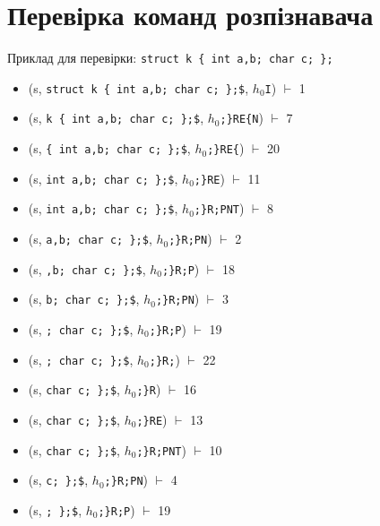 \newcommand{\xvdash}[1]{$\stackrel{\text{#1}}{\vdash}$}

\newpage
\section{Перевірка команд розпізнавача}
Приклад для перевірки: \verb|struct k { int a,b; char c; };|
\begin{itemize}
    \item[]  (s, \quad \verb|struct k { int a,b; char c; };$|,    \quad $h_{0}$\verb|I|)            $\vdash$ 1
    \item[]  (s, \quad \verb|k { int a,b; char c; };$|,           \quad $h_{0}$\verb|;}RE{N|)       $\vdash$ 7
    \item[]  (s, \quad \verb|{ int a,b; char c; };$|,             \quad $h_{0}$\verb|;}RE{|)        $\vdash$ 20
    \item[]  (s, \quad \verb|int a,b; char c; };$|,               \quad $h_{0}$\verb|;}RE|)         $\vdash$ 11
    \item[]  (s, \quad \verb|int a,b; char c; };$|,               \quad $h_{0}$\verb|;}R;PNT|)      $\vdash$ 8
    \item[]  (s, \quad \verb|a,b; char c; };$|,                   \quad $h_{0}$\verb|;}R;PN|)       $\vdash$ 2
    \item[]  (s, \quad \verb|,b; char c; };$|,                    \quad $h_{0}$\verb|;}R;P|)        $\vdash$ 18
    \item[]  (s, \quad \verb|b; char c; };$|,                     \quad $h_{0}$\verb|;}R;PN|)       $\vdash$ 3
    \item[]  (s, \quad \verb|; char c; };$|,                      \quad $h_{0}$\verb|;}R;P|)        $\vdash$ 19
    \item[]  (s, \quad \verb|; char c; };$|,                      \quad $h_{0}$\verb|;}R;|)         $\vdash$ 22
    \item[]  (s, \quad \verb|char c; };$|,                        \quad $h_{0}$\verb|;}R|)          $\vdash$ 16
    \item[]  (s, \quad \verb|char c; };$|,                        \quad $h_{0}$\verb|;}RE|)         $\vdash$ 13
    \item[]  (s, \quad \verb|char c; };$|,                        \quad $h_{0}$\verb|;}R;PNT|)      $\vdash$ 10
    \item[]  (s, \quad \verb|c; };$|,                             \quad $h_{0}$\verb|;}R;PN|)       $\vdash$ 4
    \item[]  (s, \quad \verb|; };$|,                              \quad $h_{0}$\verb|;}R;P|)        $\vdash$ 19

\end{itemize}
